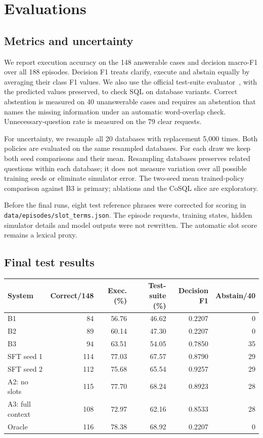 \documentclass[11pt,a4paper]{article}
\newcommand{\file}[1]{\nolinkurl{#1}}
\begin{document}
\section{Evaluations}

\subsection{Metrics and uncertainty}

We report execution accuracy on the 148 answerable cases and decision macro-F1 over all 188 episodes.
Decision F1 treats clarify, execute and abstain equally by averaging their class F1 values. We also use
the official test-suite evaluator~\cite{testsuite}, with the predicted values preserved, to check SQL on
database variants. Correct abstention is measured on 40 unanswerable cases and requires an abstention
that names the missing information under an automatic word-overlap check. Unnecessary-question rate
is measured on the 79 clear requests.

For uncertainty, we resample all 20 databases with replacement 5,000 times. Both policies are evaluated
on the same resampled databases. For each draw we keep both seed comparisons and their mean. Resampling
databases preserves related questions within each database; it does not measure variation over all
possible training seeds or eliminate simulator error. The two-seed mean trained-policy comparison
against B3 is primary; ablations and the CoSQL slice are exploratory.

Before the final runs, eight test reference phrases were corrected for scoring in
\file{data/episodes/slot_terms.json}. The episode requests, training states, hidden simulator details
and model outputs were not rewritten. The automatic slot score remains a lexical proxy.

\subsection{Final test results}

\begin{center}
\small
\begin{tabular}{lrrrrr}
\toprule
System & Correct/148 & Exec. (\%) & Test-suite (\%) & Decision F1 & Abstain/40 \\
\midrule
B1 & 84 & 56.76 & 46.62 & 0.2207 & 0 \\
B2 & 89 & 60.14 & 47.30 & 0.2207 & 0 \\
B3 & 94 & 63.51 & 54.05 & 0.7850 & 35 \\
SFT seed 1 & 114 & 77.03 & 67.57 & 0.8790 & 29 \\
SFT seed 2 & 112 & 75.68 & 65.54 & 0.9257 & 29 \\
A2: no slots & 115 & 77.70 & 68.24 & 0.8923 & 28 \\
A3: full context & 108 & 72.97 & 62.16 & 0.8533 & 28 \\
Oracle & 116 & 78.38 & 68.92 & 0.2207 & 0 \\
\bottomrule
\end{tabular}
\end{center}
\end{document}

